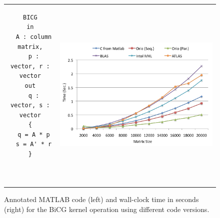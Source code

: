 \documentclass[11pt]{article}
\begin{document}
\begin{figure}[htp]
\centering
\begin{tabular}{cc}
\begin{minipage}[b]{.3\textwidth}
\footnotesize
\begin{verbatim}
BICG
in
  A : column matrix,
  p : vector, r : vector
out
  q : vector, s : vector
{
  q = A * p
  s = A' * r
}



\end{verbatim}
\end{minipage}
&
\begin{minipage}[b]{.6\textwidth}
\includegraphics[width=\textwidth]{figures/bicgkernel.png}
\end{minipage}\\
\end{tabular}
\caption{Annotated MATLAB code (left) and wall-clock time in seconds (right) for the BiCG kernel operation using different code versions.}
\label{fig:gesummv}
\end{figure}




\end{document}
